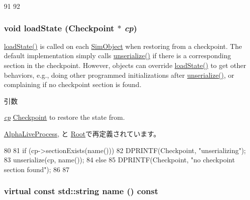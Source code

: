 \begin{DoxyCode}
91 {
92 }
\end{DoxyCode}
\hypertarget{classSimObject_a0c3e6eb311ceff72035b11f2a5e0f186}{
\subsubsection[{loadState}]{\setlength{\rightskip}{0pt plus 5cm}void loadState ({\bf Checkpoint} $\ast$ {\em cp})}}
\label{classSimObject_a0c3e6eb311ceff72035b11f2a5e0f186}
\hyperlink{classSimObject_a0c3e6eb311ceff72035b11f2a5e0f186}{loadState()} is called on each \hyperlink{classSimObject}{SimObject} when restoring from a checkpoint. The default implementation simply calls \hyperlink{classSerializable_af100c4e9feabf3cd918619c88c718387}{unserialize()} if there is a corresponding section in the checkpoint. However, objects can override \hyperlink{classSimObject_a0c3e6eb311ceff72035b11f2a5e0f186}{loadState()} to get other behaviors, e.g., doing other programmed initializations after \hyperlink{classSerializable_af100c4e9feabf3cd918619c88c718387}{unserialize()}, or complaining if no checkpoint section is found.


\begin{DoxyParams}{引数}
\item[{\em \hyperlink{namespacecp}{cp}}]\hyperlink{classCheckpoint}{Checkpoint} to restore the state from. \end{DoxyParams}


\hyperlink{classAlphaLiveProcess_a0c3e6eb311ceff72035b11f2a5e0f186}{AlphaLiveProcess}, と \hyperlink{classRoot_a0c3e6eb311ceff72035b11f2a5e0f186}{Root}で再定義されています。


\begin{DoxyCode}
80 {
81     if (cp->sectionExists(name())) {
82         DPRINTF(Checkpoint, "unserializing\n");
83         unserialize(cp, name());
84     } else {
85         DPRINTF(Checkpoint, "no checkpoint section found\n");
86     }
87 }
\end{DoxyCode}
\hypertarget{classSimObject_adbcff144e5e199d332a1352af1798148}{
\subsubsection[{name}]{\setlength{\rightskip}{0pt plus 5cm}virtual const std::string name () const}}
\label{classSimObject_adbcff144e5e199d332a1352af1798148}


